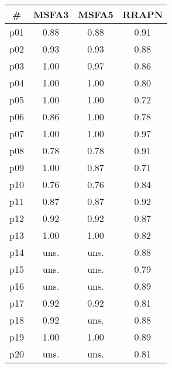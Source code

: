 \begin{tabular}{c||c|c|c}
\textbf{\#} & \textbf{MSFA3} & \textbf{MSFA5} & \textbf{RRAPN}\\
\hline
\hline
p01 & 0.88 & 0.88 & 0.91\\
p02 & 0.93 & 0.93 & 0.88\\
p03 & 1.00 & 0.97 & 0.86\\
p04 & 1.00 & 1.00 & 0.80\\
p05 & 1.00 & 1.00 & 0.72\\
p06 & 0.86 & 1.00 & 0.78\\
p07 & 1.00 & 1.00 & 0.97\\
p08 & 0.78 & 0.78 & 0.91\\
p09 & 1.00 & 0.87 & 0.71\\
p10 & 0.76 & 0.76 & 0.84\\
p11 & 0.87 & 0.87 & 0.92\\
p12 & 0.92 & 0.92 & 0.87\\
p13 & 1.00 & 1.00 & 0.82\\
p14 & uns. & uns. & 0.88\\
p15 & uns. & uns. & 0.79\\
p16 & uns. & uns. & 0.89\\
p17 & 0.92 & 0.92 & 0.81\\
p18 & 0.92 & uns. & 0.88\\
p19 & 1.00 & 1.00 & 0.89\\
p20 & uns. & uns. & 0.81\\
\end{tabular}

